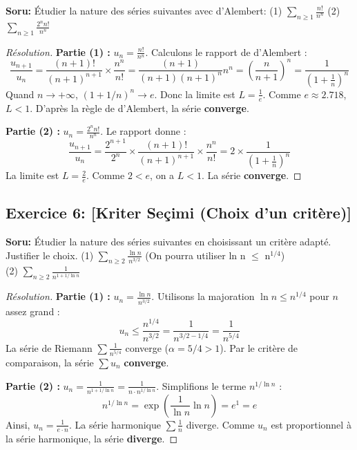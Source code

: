 \documentclass[12pt,a4paper]{report}
\begin{document}
\textbf{Soru:}
Étudier la nature des séries suivantes avec d'Alembert:
(1) $\sum_{n \ge 1} \frac{n!}{n^n}$ \qquad (2) $\sum_{n \ge 1} \frac{2^n n!}{n^n}$

\begin{proof}[Résolution]
\textbf{Partie (1) :} $u_n = \frac{n!}{n^n}$. Calculons le rapport de d'Alembert :
\[ \frac{u_{n+1}}{u_n} = \frac{(n+1)!}{(n+1)^{n+1}} \times \frac{n^n}{n!} = \frac{(n+1)}{(n+1)(n+1)^n} n^n = \left(\frac{n}{n+1}\right)^n = \frac{1}{(1 + \frac{1}{n})^n} \]
Quand $n \to +\infty$, $(1+1/n)^n \to e$. Donc la limite est $L = \frac{1}{e}$.
Comme $e \approx 2.718$, $L < 1$. D'après la règle de d'Alembert, la série \textbf{converge}.

\textbf{Partie (2) :} $u_n = \frac{2^n n!}{n^n}$.
Le rapport donne :
\[ \frac{u_{n+1}}{u_n} = \frac{2^{n+1}}{2^n} \times \frac{(n+1)!}{(n+1)^{n+1}} \times \frac{n^n}{n!} = 2 \times \frac{1}{(1 + \frac{1}{n})^n} \]
La limite est $L = \frac{2}{e}$.
Comme $2 < e$, on a $L < 1$. La série \textbf{converge}.
\end{proof}

\subsection*{Exercice 6: [Kriter Seçimi (Choix d'un critère)]}

\textbf{Soru:}
Étudier la nature des séries suivantes en choisissant un critère adapté. Justifier le choix.
(1) $\sum_{n \ge 2} \frac{\ln n}{n^{3/2}}$ (On pourra utiliser ln n $\le$ n$^{1/4}$)\\
(2) $\sum_{n \ge 2} \frac{1}{n^{1+1/\ln n}}$

\begin{proof}[Résolution]
\textbf{Partie (1) :} $u_n = \frac{\ln n}{n^{3/2}}$.
Utilisons la majoration $\ln n \le n^{1/4}$ pour $n$ assez grand :
\[ u_n \le \frac{n^{1/4}}{n^{3/2}} = \frac{1}{n^{3/2 - 1/4}} = \frac{1}{n^{5/4}} \]
La série de Riemann $\sum \frac{1}{n^{5/4}}$ converge ($\alpha = 5/4 > 1$).
Par le critère de comparaison, la série $\sum u_n$ \textbf{converge}.

\textbf{Partie (2) :} $u_n = \frac{1}{n^{1+1/\ln n}} = \frac{1}{n \cdot n^{1/\ln n}}$.
Simplifions le terme $n^{1/\ln n}$ :
\[ n^{1/\ln n} = \exp\left( \frac{1}{\ln n} \ln n \right) = e^1 = e \]
Ainsi, $u_n = \frac{1}{e \cdot n}$.
La série harmonique $\sum \frac{1}{n}$ diverge. Comme $u_n$ est proportionnel à la série harmonique, la série \textbf{diverge}.
\end{proof}
\end{document}
